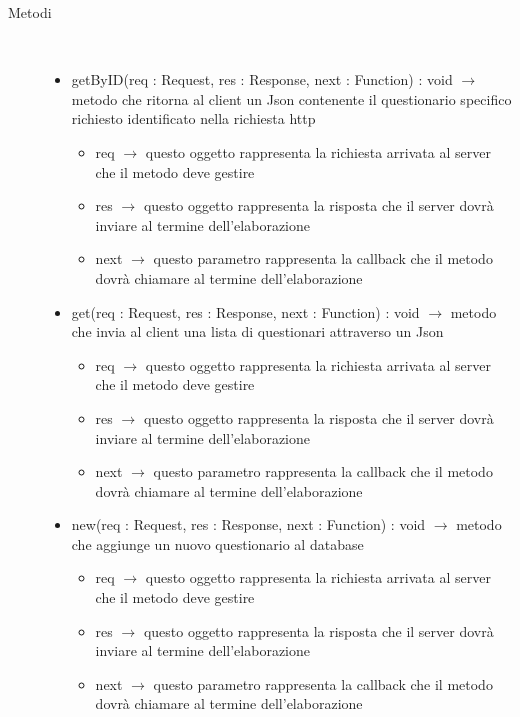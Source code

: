 \begin{description}
\item[Metodi] \hfill \\
\vspace{-7mm}
\begin{itemize}
	\item getByID(req : Request, res : Response, next : Function) : void $\rightarrow$ metodo che ritorna al client un Json contenente il questionario specifico richiesto identificato nella richiesta http\begin{itemize}
		\item req $\rightarrow$ questo oggetto rappresenta la richiesta arrivata al server che il metodo deve gestire
		\item res $\rightarrow$ questo oggetto rappresenta la risposta che il server dovrà inviare al termine dell'elaborazione
		\item next $\rightarrow$ questo parametro rappresenta la callback che il metodo dovrà chiamare al termine dell'elaborazione
	\end{itemize}
	
	\item get(req : Request, res : Response, next : Function) : void $\rightarrow$ metodo che invia al client una lista di questionari attraverso un Json\begin{itemize}
		\item req $\rightarrow$ questo oggetto rappresenta la richiesta arrivata al server che il metodo deve gestire
		\item res $\rightarrow$ questo oggetto rappresenta la risposta che il server dovrà inviare al termine dell'elaborazione
		\item next $\rightarrow$ questo parametro rappresenta la callback che il metodo dovrà chiamare al termine dell'elaborazione
	\end{itemize}
	
	\item new(req : Request, res : Response, next : Function) : void $\rightarrow$ metodo che aggiunge un nuovo questionario al database\begin{itemize}
		\item req $\rightarrow$ questo oggetto rappresenta la richiesta arrivata al server che il metodo deve gestire
		\item res $\rightarrow$ questo oggetto rappresenta la risposta che il server dovrà inviare al termine dell'elaborazione
		\item next $\rightarrow$ questo parametro rappresenta la callback che il metodo dovrà chiamare al termine dell'elaborazione
	\end{itemize}
	

\end{itemize}
\end{description}
